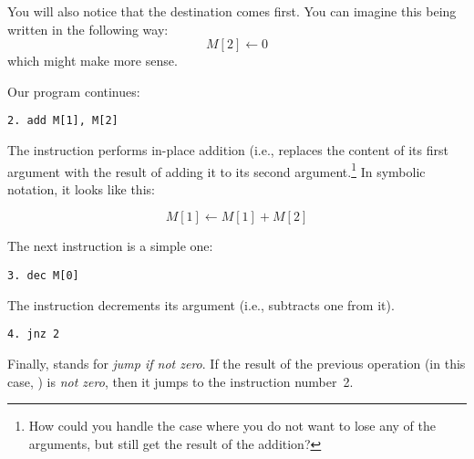 You will also notice that the destination comes first. You can imagine this
being written in the following way:
%
\[
M[2] \leftarrow 0
\]
which might make more sense.

Our program continues:

\begin{verbatim}
2. add M[1], M[2]
\end{verbatim}

The  instruction performs in-place addition (i.e., replaces
the content of its first argument with the result of adding it to its second
argument.\footnote{How could you handle the case where you do not want to lose
any of the arguments, but still get the result of the addition?} In symbolic
notation, it looks like this:

\[
M[1] \leftarrow M[1] + M[2]
\]

The next instruction is a simple one:

\begin{verbatim}
3. dec M[0]
\end{verbatim}

The  instruction decrements its argument (i.e., subtracts one
from it).

\begin{verbatim}
4. jnz 2
\end{verbatim}

Finally,  stands for \emph{jump if not zero}. If the result of
the previous operation (in this case, ) is \emph{not zero},
then it jumps to the instruction number~2.

